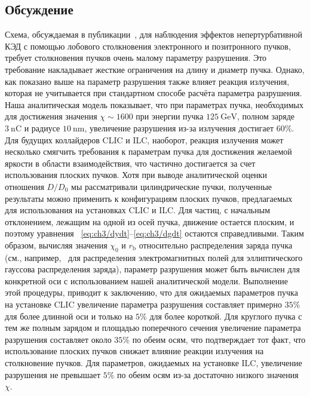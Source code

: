 \subsection{Обсуждение}
\label{sec:ch3/sec/Discussion}

Схема, обсуждаемая в публикации~\cite{yakimenko2019prospect}, для наблюдения эффектов непертурбативной КЭД с помощью лобового столкновения электронного и позитронного пучков, требует столкновения пучков очень малому параметру разрушения.
Это требование накладывает жесткие ограничения на длину и диаметр пучка.
Однако, как показано выше на параметр разрушения также влияет реакция излучения, которая не учитывается при стандартном способе расчёта параметра разрушения.
Наша аналитическая модель показывает, что при параметрах пучка, необходимых для достижения значения $\chi \sim 1600$ при энергии пучка $\SI{125}{\giga\electronvolt}$, полном заряде $\SI{3}{\nano\coulomb}$ и радиусе $\SI{10}{\nano\meter}$, увеличение разрушения из-за излучения достигает 60\%.
Для будущих коллайдеров CLIC и ILC, наоборот, реакция излучения может несколько смягчить требования к параметрам пучка для достижения желаемой яркости в области взаимодействия, что частично достигается за счет использования плоских пучков.
Хотя при выводе аналитической оценки отношения $D/D_0$ мы рассматривали цилиндрические пучки, полученные результаты можно применить к конфигурациям плоских пучков, предлагаемых для использования на установках CLIC и ILC.
Для частиц, с начальным отклонением, лежащим на одной из осей пучка, движение остается плоским, и поэтому уравнения ~\eqref{eq:ch3/dydt}--\eqref{eq:ch3/dgdt} остаются справедливыми.
Таким образом, вычисляя значения $\chi_0$ и $r_\mathrm{b}$ относительно распределения заряда пучка (см., например,~\cite{bassetti1983properties} для распределения электромагнитных полей для эллиптического гауссова распределения заряда), параметр разрушения может быть вычислен для конкретной оси с использованием нашей аналитической модели.
Выполнение этой процедуры, приводит к заключению, что для ожидаемых параметров пучка на установке CLIC увеличение параметра разрушения составляет примерно $35\%$ для более длинной оси и только на $5\%$ для более короткой.
Для круглого пучка с тем же полным зарядом и площадью поперечного сечения увеличение параметра разрушения составляет около $35\%$ по обеим осям, что  подтверждает тот факт, что использование плоских пучков снижает влияние реакции излучения на столкновение пучков.
Для параметров, ожидаемых на установке ILC, увеличение разрушения не превышает $5\%$ по обеим осям из-за достаточно низкого значения $\chi$.

